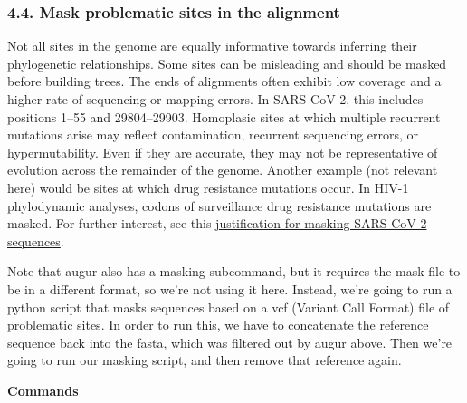 \documentclass[
]{book}
\begin{document}
\subsubsection{4.4. Mask problematic sites in the alignment}\label{mask-problematic-sites-in-the-alignment}

Not all sites in the genome are equally informative towards inferring their phylogenetic relationships. Some sites can be misleading and should be masked before building trees. The ends of alignments often exhibit low coverage and a higher rate of sequencing or mapping errors. In SARS-CoV-2, this includes positions 1--55 and 29804--29903. Homoplasic sites at which multiple recurrent mutations arise may reflect contamination, recurrent sequencing errors, or hypermutability. Even if they are accurate, they may not be representative of evolution across the remainder of the genome. Another example (not relevant here) would be sites at which drug resistance mutations occur. In HIV-1 phylodynamic analyses, codons of surveillance drug resistance mutations are masked. For further interest, see this \href{https://virological.org/t/masking-strategies-for-sars-cov-2-alignments/480}{justification for masking SARS-CoV-2 sequences}.

Note that augur also has a masking subcommand, but it requires the mask file to be in a different format, so we're not using it here. Instead, we're going to run a python script that masks sequences based on a vcf (Variant Call Format) file of problematic sites. In order to run this, we have to concatenate the reference sequence back into the fasta, which was filtered out by augur above. Then we're going to run our masking script, and then remove that reference again.

\textbf{Commands}
\end{document}

